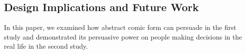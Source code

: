 \subsection{Design Implications and Future Work}
In this paper, we examined how abstract comic form can persuade in the first study and demonstrated its persuasive power on people making decisions in the real life in the second study. 

